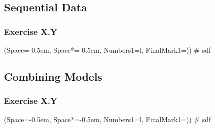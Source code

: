 \documentclass[12pt, a4paper]{article}
\newcommand{\listSpace}{-0.5em}%
\begin{document}
\subsection{Sequential Data}
\subsubsection*{Exercise X.Y}
\begin{easylist}[enumerate]
	\ListProperties(Space=\listSpace, Space*=\listSpace, Numbers1=l, FinalMark1={)})
	# sdf
\end{easylist}

\subsection{Combining Models}
\subsubsection*{Exercise X.Y}
\begin{easylist}[enumerate]
	\ListProperties(Space=\listSpace, Space*=\listSpace, Numbers1=l, FinalMark1={)})
	# sdf
\end{easylist}





































\end{document}
